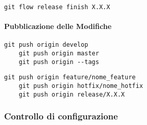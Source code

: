     \begin{lstlisting}[style=code]
    git flow release finish X.X.X
    \end{lstlisting}
    
    \paragraph*{Pubblicazione delle Modifiche}
    
    \begin{lstlisting}[style=code]
    git push origin develop
    git push origin master
    git push origin --tags
    \end{lstlisting}
    
    \begin{lstlisting}[style=code]
    git push origin feature/nome_feature
    git push origin hotfix/nome_hotfix
    git push origin release/X.X.X
    \end{lstlisting}
\subsubsection{Controllo di configurazione}
